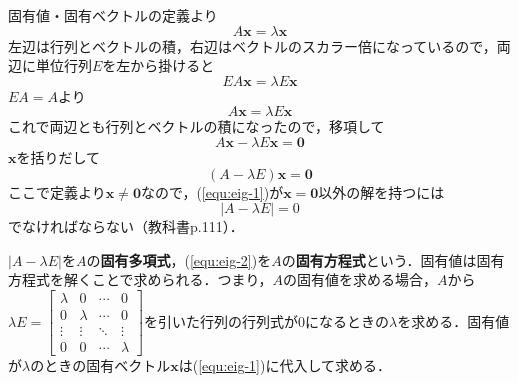 固有値・固有ベクトルの定義より
\begin{equation*}
	A\bm{x} = \lambda\bm{x}
\end{equation*}
左辺は行列とベクトルの積，右辺はベクトルのスカラー倍になっているので，両辺に単位行列$E$を左から掛けると
\begin{equation*}
	EA\bm{x} = \lambda E\bm{x}
\end{equation*}
$EA = A$より
\begin{equation*}
	A\bm{x} = \lambda E\bm{x}
\end{equation*}
これで両辺とも行列とベクトルの積になったので，移項して
\begin{equation*}
	A\bm{x} - \lambda E\bm{x} = \bm{0}
\end{equation*}
$\bm{x}$を括りだして
\begin{equation}
	(A - \lambda E)\bm{x} = \bm{0} \label{equ:eig-1}
\end{equation}
ここで定義より$\bm{x} \ne \bm{0}$なので，(\ref{equ:eig-1})が$\bm{x} = \bm{0}$以外の解を持つには
\begin{equation}
	|A - \lambda E| = 0\label{equ:eig-2}
\end{equation}
でなければならない（教科書p.111）．

$|A - \lambda E|$を$A$の\textbf{固有多項式}，(\ref{equ:eig-2})を$A$の\textbf{固有方程式}という．固有値は固有方程式を解くことで求められる．つまり，$A$の固有値を求める場合，$A$から$\lambda E =
\begin{bmatrix}
	\lambda & 0 & \cdots & 0\\
	0 & \lambda & \cdots & 0\\
	\vdots & \vdots & \ddots & \vdots\\
	0 & 0 & \cdots & \lambda
\end{bmatrix}$を引いた行列の行列式が$0$になるときの$\lambda$を求める．固有値が$\lambda$のときの固有ベクトル$\bm{x}$は(\ref{equ:eig-1})に代入して求める．

